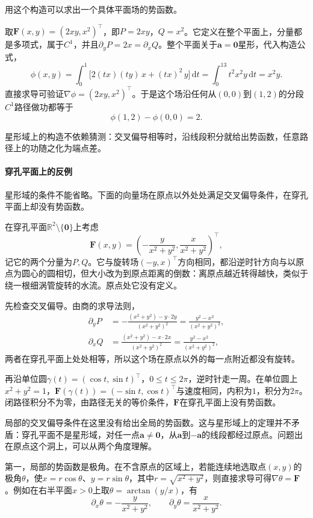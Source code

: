 用这个构造可以求出一个具体平面场的势函数。
\begin{example}[沿线段构造势函数$x^2y$]
取$\bm F(x,y)=(2xy,x^2)^\top$，即$P=2xy$，$Q=x^2$。它定义在整个平面上，分量都是多项式，属于$C^1$，并且$\partial_yP=2x=\partial_xQ$。整个平面关于$\bm a=\bm0$星形，代入构造公式，
\[
 \phi(x,y)=\int_0^1\bigl[2(tx)(ty)\,x+(tx)^2\,y\bigr]\,\mathrm dt
 =\int_0^13t^2x^2y\,\mathrm dt=x^2y.
\]
直接求导可验证$\nabla\phi=(2xy,x^2)^\top$。于是这个场沿任何从$(0,0)$到$(1,2)$的分段$C^1$路径做功都等于
\[
 \phi(1,2)-\phi(0,0)=2 .
\]
\end{example}
星形域上的构造不依赖猜测：交叉偏导相等时，沿线段积分就给出势函数，任意路径上的功随之化为端点差。

\paragraph{穿孔平面上的反例}

星形域的条件不能省略。下面的向量场在原点以外处处满足交叉偏导条件，在穿孔平面上却没有势函数。
\begin{example}[穿孔平面上的涡旋场]
\label{ex:analysis-punctured-plane-vortex}
在穿孔平面$\mathbb R^2\setminus\{\bm0\}$上考虑
\[
 \bm F(x,y)=\left(-\frac{y}{x^2+y^2},\frac{x}{x^2+y^2}\right)^\top ,
\]
记它的两个分量为$P,Q$。它与旋转场$(-y,x)^\top$方向相同，都沿逆时针方向与以原点为圆心的圆相切，但大小改为到原点距离的倒数：离原点越近转得越快，类似于绕一根细涡管旋转的水流。原点处它没有定义。

先检查交叉偏导。由商的求导法则，
\[
 \begin{aligned}
 \partial_yP&=-\frac{(x^2+y^2)-y\cdot2y}{(x^2+y^2)^2}=\frac{y^2-x^2}{(x^2+y^2)^2},\\
 \partial_xQ&=\frac{(x^2+y^2)-x\cdot2x}{(x^2+y^2)^2}=\frac{y^2-x^2}{(x^2+y^2)^2},
 \end{aligned}
\]
两者在穿孔平面上处处相等，所以这个场在原点以外的每一点附近都没有旋转。

再沿单位圆$\gamma(t)=(\cos t,\sin t)^\top$，$0\leq t\leq2\pi$，逆时针走一周。在单位圆上$x^2+y^2=1$，$\bm F(\gamma(t))=(-\sin t,\cos t)^\top$与速度相同，内积为$1$，积分为$2\pi$。
闭路径积分不为零，由路径无关的等价条件，$\bm F$在穿孔平面上没有势函数。
\end{example}

局部的交叉偏导条件在这里没有给出全局的势函数。这与星形域上的定理并不矛盾：穿孔平面不是星形域，对任一点$\bm a\neq\bm0$，从$\bm a$到$-\bm a$的线段都经过原点。问题出在原点这个洞上，可以从两个角度理解。

第一，局部的势函数是极角。在不含原点的区域上，若能连续地选取点$(x,y)$的极角$\theta$，使$x=r\cos\theta$、$y=r\sin\theta$，其中$r=\sqrt{x^2+y^2}$，则直接求导可得$\nabla\theta=\bm F$。例如在右半平面$x>0$上取$\theta=\arctan(y/x)$，有
\[
 \partial_x\theta=-\frac y{x^2+y^2},\qquad \partial_y\theta=\frac x{x^2+y^2}.
\]

